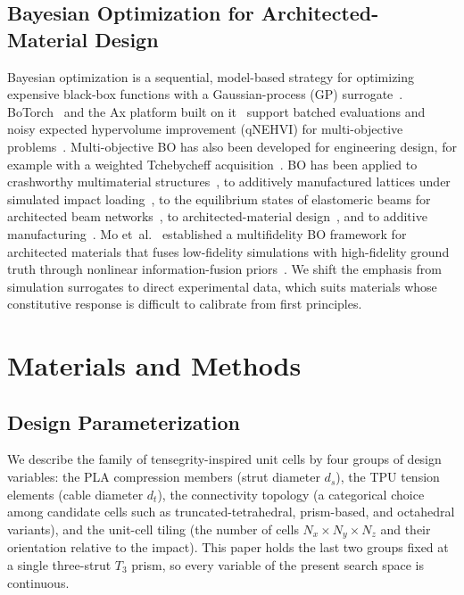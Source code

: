 \documentclass[11pt]{article}
\begin{document}
\subsection{Bayesian Optimization for Architected-Material Design}

Bayesian optimization is a sequential, model-based strategy for
optimizing expensive black-box functions with a Gaussian-process (GP)
surrogate~\citep{shahriari2016taking, frazier2018tutorial}.
BoTorch~\citep{balandat2020botorch} and the Ax platform built on
it~\citep{pmlr-v293-olson25a} support batched evaluations and noisy
expected hypervolume improvement (qNEHVI) for multi-objective
problems~\citep{daulton2021nehvi}. Multi-objective BO has also been
developed for engineering design, for example with a weighted Tchebycheff
acquisition~\citep{biswas2022mobotchebycheff}. BO has been applied to
crashworthy multimaterial structures~\citep{liu2019crashworthinessbo},
to additively manufactured lattices under simulated impact
loading~\citep{hertlein2024latticeimpact}, to the equilibrium states of
elastomeric beams for architected beam
networks~\citep{yoo2021elastomericbeams}, to architected-material
design~\citep{mo2023accelerated}, and to additive
manufacturing~\citep{zhang2021bo}. Mo et~al.~\cite{mo2023accelerated}
established a multifidelity BO framework for architected materials that
fuses low-fidelity simulations with high-fidelity ground truth through
nonlinear information-fusion priors~\citep{perdikaris2017nonlinear}. We
shift the emphasis from simulation surrogates to direct experimental
data, which suits materials whose constitutive response is difficult to
calibrate from first principles.

\section{Materials and Methods}
\label{sec:methods}

\subsection{Design Parameterization}
\label{sec:methods:parameterization}

We describe the family of tensegrity-inspired unit cells by four groups
of design variables: the PLA compression members (strut diameter $d_s$),
the TPU tension elements (cable diameter $d_t$), the connectivity
topology (a categorical choice among candidate cells such as
truncated-tetrahedral, prism-based, and octahedral variants), and the
unit-cell tiling (the number of cells $N_x \times N_y \times N_z$ and
their orientation relative to the impact). This paper holds the last
two groups fixed at a single three-strut $T_3$ prism, so every variable
of the present search space is continuous.
\end{document}
